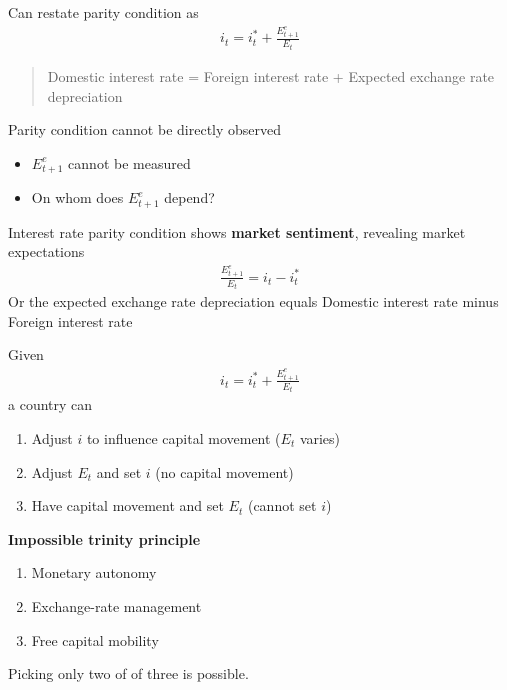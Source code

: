 \documentclass{beamer}
\begin{document}
\begin{frame}
  Can restate parity condition as
  \begin{align}
    i_t = i^*_t +  \frac{E^e_{t+1}}{E_t}
  \end{align}
  \begin{quote}
    Domestic interest rate = Foreign interest rate + Expected exchange rate depreciation
  \end{quote}
  Parity condition cannot be directly observed
  \begin{itemize}
    \item $E^e_{t+1}$ cannot be measured
    \item On whom does $E^e_{t+1}$ depend? 
  \end{itemize}  
\end{frame}

\begin{frame}
 Interest rate parity condition shows \textbf{market sentiment}, revealing market expectations
  \begin{align}
      \frac{E^e_{t+1}}{E_t} = i_t - i^*_t 
  \end{align} 
  Or the expected exchange rate depreciation equals Domestic interest rate minus Foreign interest rate  
\end{frame}

\begin{frame}
  Given 
  \begin{align}
    i_t = i^*_t +  \frac{E^e_{t+1}}{E_t}
  \end{align}
   a country can 
  \begin{enumerate}
    \item Adjust $i$ to influence capital movement ($E_t$ varies)
    \item Adjust $E_t$ and set $i$ (no capital movement)
    \item Have capital movement and set $E_t$ (cannot set $i$)
  \end{enumerate}
\end{frame}

\begin{frame}
  \textbf{Impossible trinity principle}
  \begin{enumerate}
    \item Monetary autonomy
    \item Exchange-rate management
    \item Free capital mobility    
  \end{enumerate}
  \medskip
  Picking only two of of three is possible.
\end{frame}
\end{document}

